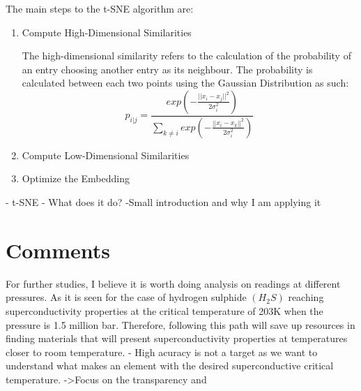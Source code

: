 \documentclass{article}\usepackage[]{graphicx}\usepackage[]{xcolor}
\begin{document}
The main steps to the t-SNE algorithm are:

\begin{enumerate}
    \item Compute High-Dimensional Similarities
    
        The high-dimensional similarity refers to the calculation of the probability of an entry choosing another entry as its neighbour. The probability is calculated between each two points using the Gaussian Distribution as such:
       $$p_{i|j} = \frac{exp(-\frac{||x_i - x_j||^2}{2\sigma_i^2})}{\sum_{k \neq i} exp(- \frac{||x_i - x_k||^2}{2\sigma_i^2})}$$

    \item Compute Low-Dimensional Similarities
    \item Optimize the Embedding
\end{enumerate}


 
- t-SNE - What does it do?
-Small introduction and why I am applying it

\section{Comments}
For further studies, I believe it is worth doing analysis on readings at different pressures. As it is seen for the case of hydrogen sulphide $(H_2S)$ reaching superconductivity properties at the critical temperature of 203K when the pressure is 1.5 million bar. Therefore, following this path will save up resources in finding materials that will present superconductivity properties at temperatures closer to room temperature.
- High acuracy is not a target as we want to understand what makes an element with the desired superconductive critical temperature. -\textgreater Focus on the transparency and 
\end{document}
